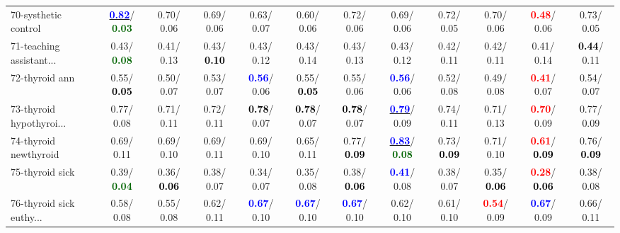 \begin{table}[h]
\begin{center}
{\begin{tabular}{lc|c|c|c|c|c|c|c|c|c|c}
70-systhetic control & \underline{\textcolor{blue}{\textbf{  0.82}}}/\textcolor{darkgreen}{\textbf{  0.03}} &   0.70/  0.06 &   0.69/  0.06 &   0.63/  0.07 &   0.60/  0.06 &   0.72/  0.06 &   0.69/  0.06 &   0.72/  0.05 &   0.70/  0.06 & \textcolor{red}{\textbf{  0.48}}/  0.06 &   0.73/  0.05 \\
71-teaching assistant... &   0.43/\textcolor{darkgreen}{\textbf{  0.08}} &   0.41/  0.13 &   0.43/\textcolor{black}{\textbf{  0.10}} &   0.43/  0.12 &   0.43/  0.14 &   0.43/  0.13 &   0.43/  0.12 &   0.42/  0.11 &   0.42/  0.11 &   0.41/  0.14 & \textcolor{black}{\textbf{  0.44}}/  0.11 \\ \hline
72-thyroid ann &   0.55/\textcolor{black}{\textbf{  0.05}} &   0.50/  0.07 &   0.53/  0.07 & \textcolor{blue}{\textbf{  0.56}}/  0.06 &   0.55/\textcolor{black}{\textbf{  0.05}} &   0.55/  0.06 & \textcolor{blue}{\textbf{  0.56}}/  0.06 &   0.52/  0.08 &   0.49/  0.08 & \textcolor{red}{\textbf{  0.41}}/  0.07 &   0.54/  0.07 \\
73-thyroid hypothyroi... &   0.77/  0.08 &   0.71/  0.11 &   0.72/  0.11 & \textcolor{black}{\textbf{  0.78}}/  0.07 & \textcolor{black}{\textbf{  0.78}}/  0.07 & \textcolor{black}{\textbf{  0.78}}/  0.07 & \underline{\textcolor{blue}{\textbf{  0.79}}}/  0.09 &   0.74/  0.11 &   0.71/  0.13 & \textcolor{red}{\textbf{  0.70}}/  0.09 &   0.77/  0.09 \\
74-thyroid newthyroid &   0.69/  0.11 &   0.69/  0.10 &   0.69/  0.11 &   0.69/  0.10 &   0.65/  0.11 &   0.77/\textcolor{black}{\textbf{  0.09}} & \underline{\textcolor{blue}{\textbf{  0.83}}}/\textcolor{darkgreen}{\textbf{  0.08}} &   0.73/\textcolor{black}{\textbf{  0.09}} &   0.71/  0.10 & \textcolor{red}{\textbf{  0.61}}/\textcolor{black}{\textbf{  0.09}} &   0.76/\textcolor{black}{\textbf{  0.09}} \\
75-thyroid sick &   0.39/\textcolor{darkgreen}{\textbf{  0.04}} &   0.36/\textcolor{black}{\textbf{  0.06}} &   0.38/  0.07 &   0.34/  0.07 &   0.35/  0.08 &   0.38/\textcolor{black}{\textbf{  0.06}} & \textcolor{blue}{\textbf{  0.41}}/  0.08 &   0.38/  0.07 &   0.35/\textcolor{black}{\textbf{  0.06}} & \textcolor{red}{\textbf{  0.28}}/\textcolor{black}{\textbf{  0.06}} &   0.38/  0.08 \\
76-thyroid sick euthy... &   0.58/  0.08 &   0.55/  0.08 &   0.62/  0.11 & \textcolor{blue}{\textbf{  0.67}}/  0.10 & \textcolor{blue}{\textbf{  0.67}}/  0.10 & \textcolor{blue}{\textbf{  0.67}}/  0.10 &   0.62/  0.10 &   0.61/  0.10 & \textcolor{red}{\textbf{  0.54}}/  0.09 & \textcolor{blue}{\textbf{  0.67}}/  0.09 &   0.66/  0.11 \\

\end{tabular}}
\end{center}
\end{table}
